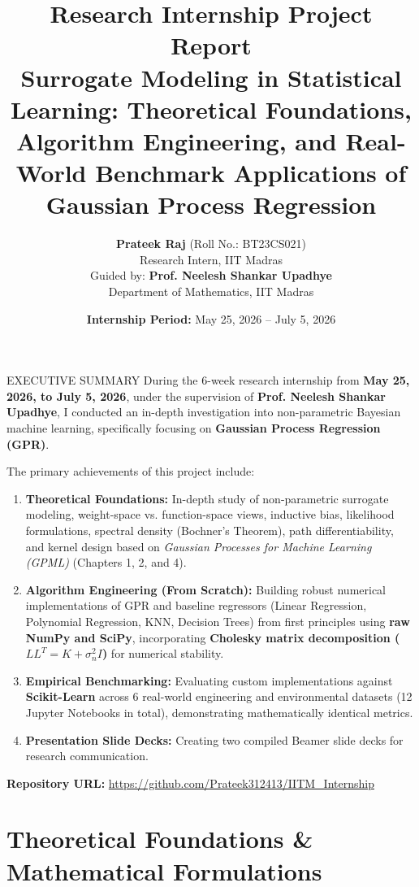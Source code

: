 \documentclass[11pt,a4paper]{article}
\title{\vspace{-1.5cm}\color{iitmblue}\Huge\bfseries Research Internship Project Report\\[6pt]
\Large Surrogate Modeling in Statistical Learning: Theoretical Foundations, Algorithm Engineering, and Real-World Benchmark Applications of Gaussian Process Regression}
\author{\textbf{Prateek Raj} (Roll No.: BT23CS021)\\[3pt]
\small Research Intern, IIT Madras\\[2pt]
\small Guided by: \textbf{Prof. Neelesh Shankar Upadhye}\\[2pt]
\small Department of Mathematics, IIT Madras}
\date{\textbf{Internship Period:} May 25, 2026 -- July 5, 2026}
\begin{document}
\maketitle

\vspace{-0.5cm}
\begin{summarybox}{EXECUTIVE SUMMARY}
During the 6-week research internship from \textbf{May 25, 2026, to July 5, 2026}, under the supervision of \textbf{Prof. Neelesh Shankar Upadhye}, I conducted an in-depth investigation into non-parametric Bayesian machine learning, specifically focusing on \textbf{Gaussian Process Regression (GPR)}. 

The primary achievements of this project include:
\begin{enumerate}[leftmargin=*]
  \item \textbf{Theoretical Foundations:} In-depth study of non-parametric surrogate modeling, weight-space vs. function-space views, inductive bias, likelihood formulations, spectral density (Bochner's Theorem), path differentiability, and kernel design based on \emph{Gaussian Processes for Machine Learning (GPML)} (Chapters 1, 2, and 4).
  \item \textbf{Algorithm Engineering (From Scratch):} Building robust numerical implementations of GPR and baseline regressors (Linear Regression, Polynomial Regression, KNN, Decision Trees) from first principles using \textbf{raw NumPy and SciPy}, incorporating \textbf{Cholesky matrix decomposition ($LL^T = K + \sigma_n^2 I$)} for numerical stability.
  \item \textbf{Empirical Benchmarking:} Evaluating custom implementations against \textbf{Scikit-Learn} across 6 real-world engineering and environmental datasets (12 Jupyter Notebooks in total), demonstrating mathematically identical metrics.
  \item \textbf{Presentation Slide Decks:} Creating two compiled Beamer slide decks for research communication.
\end{enumerate}
\textbf{Repository URL:} \url{https://github.com/Prateek312413/IITM_Internship}
\end{summarybox}

\section{Theoretical Foundations \& Mathematical Formulations}
\end{document}
